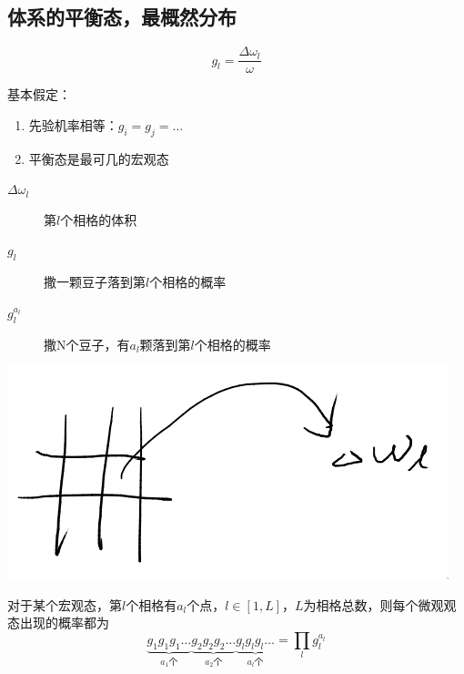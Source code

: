 \subsection{体系的平衡态，最概然分布}
\begin{definition}
  \begin{equation}
    g_l = \frac{\Delta \omega_l}{\omega}
  \end{equation}
\end{definition}

基本假定：
\begin{enumerate}
  \item 先验机率相等：\(g_i = g_j = \dots\)
  \item 平衡态是最可几的宏观态
\end{enumerate}
\begin{margintable}
  \begin{description}
  \item[\(\Delta \omega_l\)]   第\(l\)个相格的体积  \\
  \item[\(g_l\)]   撒一颗豆子落到第\(l\)个相格的概率  \\
  \item[\(g_l^{a_l}\)]   撒N个豆子，有\(a_l\)颗落到第\(l\)个相格的概率
  \end{description}
\end{margintable}
\begin{marginfigure}
\includegraphics[width=\textwidth]{figures/2022-09-07T223529+0800.png} \\
\end{marginfigure}
对于某个宏观态，第$l$个相格有\(a_l\)个点，\(l \in [1, L]\)，\(L\)为相格总数，则每个微观观态出现的概率都为
\begin{equation*}
  \underbrace{g_1 g_1 g_1\dots}_{a_1\text{个}}
  \underbrace{g_2 g_2 g_2\dots}_{a_2\text{个}}
  \underbrace{g_l g_l g_l\dots}_{a_l\text{个}}
  = \prod_l g_l^{a_l}
\end{equation*}
